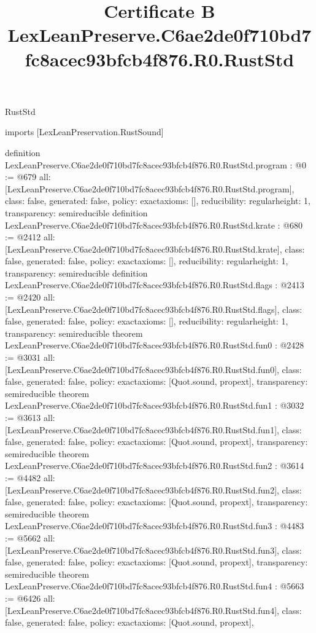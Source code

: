\begin{lexlean}{RustStd}
\title{Certificate B LexLeanPreserve.C6ae2de0f710bd7fc8acec93bfcb4f876.R0.RustStd}
\begin{coremodule}
imports [LexLeanPreservation.RustSound]

definition LexLeanPreserve.C6ae2de0f710bd7fc8acec93bfcb4f876.R0.RustStd.program : @0 := @679 {
  all: [LexLeanPreserve.C6ae2de0f710bd7fc8acec93bfcb4f876.R0.RustStd.program],
  class: false,
  generated: false,
  policy: exact{axioms: []},
  reducibility: regular{height: 1},
  transparency: semireducible
}
definition LexLeanPreserve.C6ae2de0f710bd7fc8acec93bfcb4f876.R0.RustStd.krate : @680 := @2412 {
  all: [LexLeanPreserve.C6ae2de0f710bd7fc8acec93bfcb4f876.R0.RustStd.krate],
  class: false,
  generated: false,
  policy: exact{axioms: []},
  reducibility: regular{height: 1},
  transparency: semireducible
}
definition LexLeanPreserve.C6ae2de0f710bd7fc8acec93bfcb4f876.R0.RustStd.flags : @2413 := @2420 {
  all: [LexLeanPreserve.C6ae2de0f710bd7fc8acec93bfcb4f876.R0.RustStd.flags],
  class: false,
  generated: false,
  policy: exact{axioms: []},
  reducibility: regular{height: 1},
  transparency: semireducible
}
theorem LexLeanPreserve.C6ae2de0f710bd7fc8acec93bfcb4f876.R0.RustStd.fun0 : @2428 := @3031 {
  all: [LexLeanPreserve.C6ae2de0f710bd7fc8acec93bfcb4f876.R0.RustStd.fun0],
  class: false,
  generated: false,
  policy: exact{axioms: [Quot.sound, propext]},
  transparency: semireducible
}
theorem LexLeanPreserve.C6ae2de0f710bd7fc8acec93bfcb4f876.R0.RustStd.fun1 : @3032 := @3613 {
  all: [LexLeanPreserve.C6ae2de0f710bd7fc8acec93bfcb4f876.R0.RustStd.fun1],
  class: false,
  generated: false,
  policy: exact{axioms: [Quot.sound, propext]},
  transparency: semireducible
}
theorem LexLeanPreserve.C6ae2de0f710bd7fc8acec93bfcb4f876.R0.RustStd.fun2 : @3614 := @4482 {
  all: [LexLeanPreserve.C6ae2de0f710bd7fc8acec93bfcb4f876.R0.RustStd.fun2],
  class: false,
  generated: false,
  policy: exact{axioms: [Quot.sound, propext]},
  transparency: semireducible
}
theorem LexLeanPreserve.C6ae2de0f710bd7fc8acec93bfcb4f876.R0.RustStd.fun3 : @4483 := @5662 {
  all: [LexLeanPreserve.C6ae2de0f710bd7fc8acec93bfcb4f876.R0.RustStd.fun3],
  class: false,
  generated: false,
  policy: exact{axioms: [Quot.sound, propext]},
  transparency: semireducible
}
theorem LexLeanPreserve.C6ae2de0f710bd7fc8acec93bfcb4f876.R0.RustStd.fun4 : @5663 := @6426 {
  all: [LexLeanPreserve.C6ae2de0f710bd7fc8acec93bfcb4f876.R0.RustStd.fun4],
  class: false,
  generated: false,
  policy: exact{axioms: [Quot.sound, propext]},
}
\end{coremodule}
\end{lexlean}
